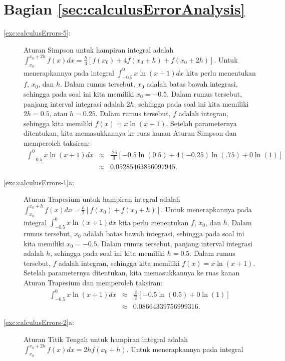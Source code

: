 \section*{Bagian \ref{sec:calculusErrorAnalysis}}
\begin{description}
\item [{\ref{exc:calculusErrors-5}:}] Aturan Simpson untuk hampiran integral
adalah ${\displaystyle \int_{x_{0}}^{x_{0}+2h}f(x)dx=\frac{h}{3}\left[f(x_{0})+4f(x_{0}+h)+f(x_{0}+2h)\right]}$.
Untuk menerapkannya pada integral ${\displaystyle \int_{-0.5}^{0}x\ln(x+1)dx}$
kita perlu menentukan $f$, $x_{0}$, dan $h$. Dalam rumus tersebut,
$x_{0}$ adalah batas bawah integrasi, sehingga pada soal ini kita
memiliki $x_{0}=-0.5$. Dalam rumus tersebut, panjang interval integrasi
adalah $2h$, sehingga pada soal ini kita memiliki $2h=0.5$, atau
$h=0.25$. Dalam rumus tersebut, $f$ adalah integran, sehingga kita
memiliki $f(x)=x\ln(x+1)$. Setelah parameternya ditentukan, kita
memasukkannya ke ruas kanan Aturan Simpson dan memperoleh taksiran:
\begin{eqnarray*}
{\displaystyle \int_{-0.5}^{0}x\ln(x+1)dx} & \approx & \frac{.25}{3}\left[-0.5\ln(0.5)+4(-0.25)\ln(.75)+0\ln(1)\right]\\
 & \approx & 0.05285463856097945.
\end{eqnarray*}
\item [{\ref{exc:calculusErrors-1}a:}] Aturan Trapesium untuk hampiran
integral adalah ${\displaystyle \int_{x_{0}}^{x_{0}+h}f(x)dx=\frac{h}{2}\left[f(x_{0})+f(x_{0}+h)\right]}$.
Untuk menerapkannya pada integral ${\displaystyle \int_{-0.5}^{0}x\ln(x+1)dx}$
kita perlu menentukan $f$, $x_{0}$, dan $h$. Dalam rumus tersebut,
$x_{0}$ adalah batas bawah integrasi, sehingga pada soal ini kita
memiliki $x_{0}=-0.5$. Dalam rumus tersebut, panjang interval integrasi
adalah $h$, sehingga pada soal ini kita memiliki $h=0.5$. Dalam
rumus tersebut, $f$ adalah integran, sehingga kita memiliki $f(x)=x\ln(x+1)$.
Setelah parameternya ditentukan, kita memasukkannya ke ruas kanan
Aturan Trapesium dan memperoleh taksiran:
\begin{eqnarray*}
{\displaystyle \int_{-0.5}^{0}x\ln(x+1)dx} & \approx & \frac{.5}{2}\left[-0.5\ln(0.5)+0\ln(1)\right]\\
 & \approx & 0.08664339756999316.
\end{eqnarray*}
\item [{\ref{exc:calculusErrors-2}a:}] Aturan Titik Tengah untuk hampiran
integral adalah ${\displaystyle \int_{x_{0}}^{x_{0}+2h}f(x)dx=2hf(x_{0}+h)}$.
Untuk menerapkannya pada integral 

\end{description}
